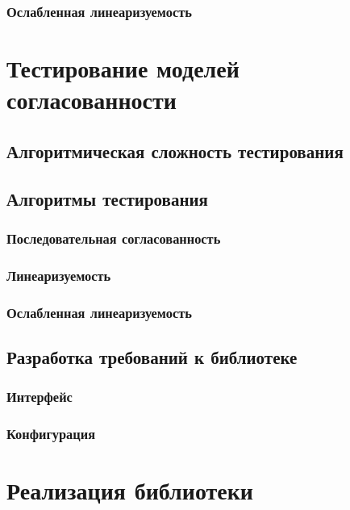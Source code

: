 \documentclass[14pt, openany]{book}
\begin{document}
\subsection{Ослабленная линеаризуемость}

\chapter{Тестирование моделей согласованности}

\section{Алгоритмическая сложность тестирования}

\section{Алгоритмы тестирования}

\subsection{Последовательная согласованность}

\subsection{Линеаризуемость}

\subsection{Ослабленная линеаризуемость}

\section{Разработка требований к библиотеке}

\subsection{Интерфейс}

\subsection{Конфигурация}

\chapter{Реализация библиотеки}
\end{document}

